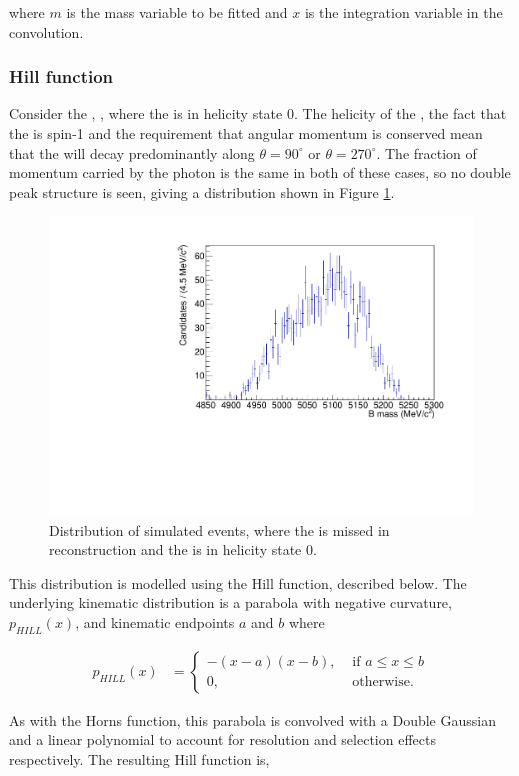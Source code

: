 where $m$ is the mass variable to be fitted and $x$ is the integration variable in the convolution.

\subsubsection{Hill function}

Consider the \decay{\Bm}{\Dstarz\Kstarm}, \decay{\Dstarz}{\Dz\gamma}, where the \Dstarz is in helicity state 0. The helicity of the \Dstarz, the fact that the \Pgamma is spin-1 and the requirement that angular momentum is conserved mean that the \Pgamma will decay predominantly along $\theta = 90^{\circ}$ or $\theta = 270^{\circ}$. The fraction of momentum carried by the photon is the same in both of these cases, so no double peak structure is seen, giving a distribution shown in Figure \ref{fig:hill}.

\begin{figure}[h]
\centering
\includegraphics[width=0.5\linewidth]{figures/fitComponents/hill.pdf}
\caption{Distribution of simulated \decay{\Bm}{(\decay{\Dstarz}{\Dz\gamma})\Kstarm} events, where the \Pgamma is missed in reconstruction and the \Dstarz is in helicity state 0.}
\label{fig:hill}
\end{figure}

This distribution is modelled using the Hill function, described below. The underlying kinematic distribution is a parabola with negative curvature, $p_{HILL}(x)$, and kinematic endpoints $a$ and $b$ where

\begin{align}
p_{HILL}(x) &= \begin{cases}
-(x - a)(x - b), & \text{ if $a \leq x \leq b$}\\ 	
0, & \text{ otherwise.}
\end{cases} 
\end{align}

As with the Horns function, this parabola is convolved with a Double Gaussian and a linear polynomial to account for resolution and selection effects respectively. The resulting Hill function is,

